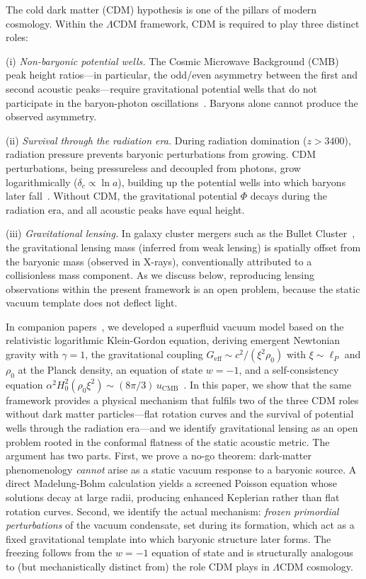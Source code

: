 \documentclass[12pt, a4paper]{article}
\newcommand{\Geff}{G_{\mathrm{eff}}}
\begin{document}
The cold dark matter (CDM) hypothesis is one of the pillars of modern cosmology. Within the $\Lambda$CDM framework, CDM is required to play three distinct roles:

(i) \emph{Non-baryonic potential wells.} The Cosmic Microwave Background (CMB) peak height ratios---in particular, the odd/even asymmetry between the first and second acoustic peaks---require gravitational potential wells that do not participate in the baryon-photon oscillations~\cite{planck_2020}. Baryons alone cannot produce the observed asymmetry.

(ii) \emph{Survival through the radiation era.} During radiation domination ($z > 3400$), radiation pressure prevents baryonic perturbations from growing. CDM perturbations, being pressureless and decoupled from photons, grow logarithmically ($\delta_c \propto \ln a$), building up the potential wells into which baryons later fall~\cite{dodelson_2003}. Without CDM, the gravitational potential $\Phi$ decays during the radiation era, and all acoustic peaks have equal height.

(iii) \emph{Gravitational lensing.} In galaxy cluster mergers such as the Bullet Cluster~\cite{clowe_2006}, the gravitational lensing mass (inferred from weak lensing) is spatially offset from the baryonic mass (observed in X-rays), conventionally attributed to a collisionless mass component. As we discuss below, reproducing lensing observations within the present framework is an open problem, because the static vacuum template does not deflect light.

In companion papers~\cite{kulangiev_2026a,kulangiev_2026b,kulangiev_2026e,kulangiev_2026c_cosmo}, we developed a superfluid vacuum model based on the relativistic logarithmic Klein-Gordon equation, deriving emergent Newtonian gravity with $\gamma = 1$, the gravitational coupling $\Geff \sim c^2/(\xi^2\rho_0)$ with $\xi \sim \ell_P$ and $\rho_0$ at the Planck density, an equation of state $w = -1$, and a self-consistency equation $\alpha^2 H_0^2(\rho_0\xi^2) \sim (8\pi/3)\,u_{\mathrm{CMB}}$~\cite{kulangiev_2026c_cosmo,kulangiev_2026c_letter}. In this paper, we show that the same framework provides a physical mechanism that fulfils two of the three CDM roles without dark matter particles---flat rotation curves and the survival of potential wells through the radiation era---and we identify gravitational lensing as an open problem rooted in the conformal flatness of the static acoustic metric. The argument has two parts. First, we prove a no-go theorem: dark-matter phenomenology \emph{cannot} arise as a static vacuum response to a baryonic source. A direct Madelung-Bohm calculation yields a screened Poisson equation whose solutions decay at large radii, producing enhanced Keplerian rather than flat rotation curves. Second, we identify the actual mechanism: \emph{frozen primordial perturbations} of the vacuum condensate, set during its formation, which act as a fixed gravitational template into which baryonic structure later forms. The freezing follows from the $w = -1$ equation of state and is structurally analogous to (but mechanistically distinct from) the role CDM plays in $\Lambda$CDM cosmology.
\end{document}
